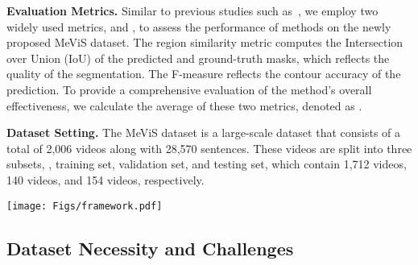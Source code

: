 \documentclass[10pt,twocolumn,letterpaper]{article}
\newcommand{\myparagraph}[1]{{\vspace{.5em} \noindent \bf #1}}
\newcommand{\numvideo}{2,006\xspace}
\newcommand{\numsentence}{28,570\xspace}
\newcommand{\ourdataset}{MeViS\xspace}
\newcommand{\ourmodel}{LMPM\xspace}
\begin{document}
\myparagraph{Evaluation Metrics.} Similar to previous studies such as~\cite{khoreva2018video,seo2020urvos}, we employ two widely used metrics,  and , to assess the performance of methods on the newly proposed \ourdataset dataset. The region similarity metric  computes the Intersection over Union (IoU) of the predicted and ground-truth masks, which reflects the quality of the segmentation. The F-measure  reflects the contour accuracy of the prediction. To provide a comprehensive evaluation of the method's overall effectiveness, we calculate the average of these two metrics, denoted as .


\myparagraph{Dataset Setting.} The \ourdataset dataset is a large-scale dataset that consists of a total of \numvideo videos along with \numsentence sentences. 
These videos are split into three subsets, \ie, training set, validation set, and testing set, which contain 1,712 videos, 140 videos, and 154 videos, respectively.


\begin{figure*}
    \centering
    \texttt{[image: Figs/framework.pdf]}
    \vspace{-5.6mm}
    \caption{The overview architecture of the proposed baseline approach Language-guided Motion Perception and Matching (\textbf{\ourmodel}). We first detect all possible target objects in each frame of the video and use object embeddings to represent them through Language-Guided Extractor. Then, Motion Perception is conducted on all the object embeddings of the video to grasp the global temporal context. By leveraging language queries and object embeddings with motion information, we generate object trajectories through a Transformer Decoder. Finally, we match the language features with the predicted object trajectories to identify the target object(s).}
    \label{fig:L-MAM}
    \vspace{-3mm}
\end{figure*}


\subsection{Dataset Necessity and Challenges}
\end{document}
